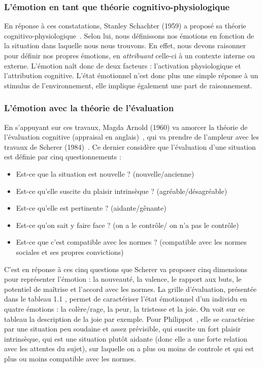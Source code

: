 \subsubsection{L'émotion en tant que théorie cognitivo-physiologique}
En réponse à ces constatations, Stanley Schachter (1959) a proposé sa théorie cognitivo-physiologique~\cite{Schachter1959,Schachter1962}. Selon lui, nous définissons nos émotions en fonction de la situation dans laquelle nous nous trouvons. En effet, nous devons raisonner pour définir nos propres émotions, en \textit{attribuant} celle-ci à un contexte interne ou externe. L'émotion naît donc de deux facteurs : l'activation physiologique et l'attribution cognitive. L'état émotionnel n'est donc plus une simple réponse à un stimulus de l'environnement, elle implique également une part de raisonnement.


\subsubsection{L'émotion avec la théorie de l'évaluation}
En s'appuyant sur ces travaux, Magda Arnold (1960) va amorcer la théorie de l'évaluation cognitive (appraisal en anglais)~\cite{Arnold1960}, qui va prendre de l'ampleur avec les travaux de Scherer (1984)~\cite{Scherer1984}. Ce dernier considère que l'évaluation d'une situation est définie par cinq questionnements :
\begin{itemize}
  \item Est-ce que la situation est nouvelle ? (nouvelle/ancienne)
  \item Est-ce qu'elle suscite du plaisir intrinsèque ? (agréable/désagréable)
  \item Est-ce qu'elle est pertinente ? (aidante/gênante)
  \item Est-ce qu'on sait y faire face ? (on a le contrôle/ on n'a pas le contrôle)
  \item Est-ce que c'est compatible avec les normes ? (compatible avec les normes sociales et ses propres convictions)
\end{itemize}

C'est en réponse à ces cinq questions que Scherer va proposer cinq dimensions pour représenter l'émotion : la nouveauté, la valence, le rapport aux buts, le potentiel de maîtrise et l'accord avec les normes. La grille d'évaluation, présentée dans le tableau 1.1
, permet de caractériser l'état émotionnel d'un individu en quatre émotions : la colère/rage, la peur, la tristesse et la joie.
On voit sur ce tableau la description de la joie par exemple. Pour Philippot~\cite{Philippot2002}, elle se caractérise par une situation peu soudaine et assez prévisible, qui suscite un fort plaisir intrinsèque, qui est une situation plutôt aidante (donc elle a une forte relation avec les attentes du sujet), sur laquelle on a plus ou moins de controle et qui est plus ou moins compatible avec les normes.

